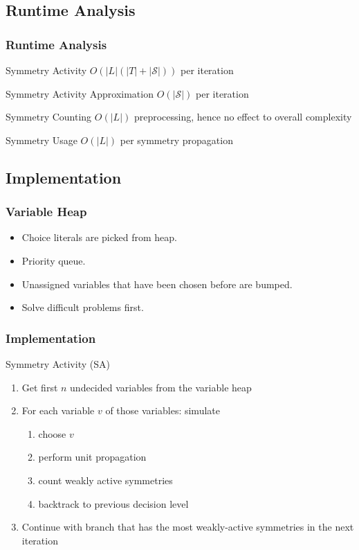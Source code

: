 \documentclass{beamer}
\begin{document}
	\subsection{Runtime Analysis}
	\begin{frame}
		\frametitle{Runtime Analysis}

		\begin{block}{Symmetry Activity}
			$O(|L|(|T| + |\mathcal{S}|))$ per iteration
		\end{block}
		\begin{block}{Symmetry Activity Approximation}
			$O(|\mathcal{S}|)$ per iteration
		\end{block}
		\begin{block}{Symmetry Counting}
			$O(|L|)$ preprocessing, hence no effect to overall complexity
		\end{block}
		\begin{block}{Symmetry Usage}
			$O(|L|)$ per symmetry propagation
		\end{block}
	\end{frame}

	\subsection{Implementation}
	\begin{frame}
		\frametitle{Variable Heap}

		\begin{itemize}
			\item Choice literals are picked from heap.
			\item Priority queue.
			\item Unassigned variables that have been chosen before are bumped.
			\item Solve difficult problems first.
		\end{itemize}
	\end{frame}

	\begin{frame}%
		\frametitle{Implementation}

		\begin{block}{Symmetry Activity (SA)}
			\begin{enumerate}
				\item Get first $n$ undecided variables from the variable heap
				\item For each variable $v$ of those variables: simulate
						\begin{enumerate}
							\item choose $v$
							\item perform unit propagation
							\item count weakly active symmetries
							\item backtrack to previous decision level
						\end{enumerate}
				\item Continue with branch that has the most weakly-active symmetries in the next
					iteration
			\end{enumerate}
		\end{block}
	\end{frame}
\end{document}
